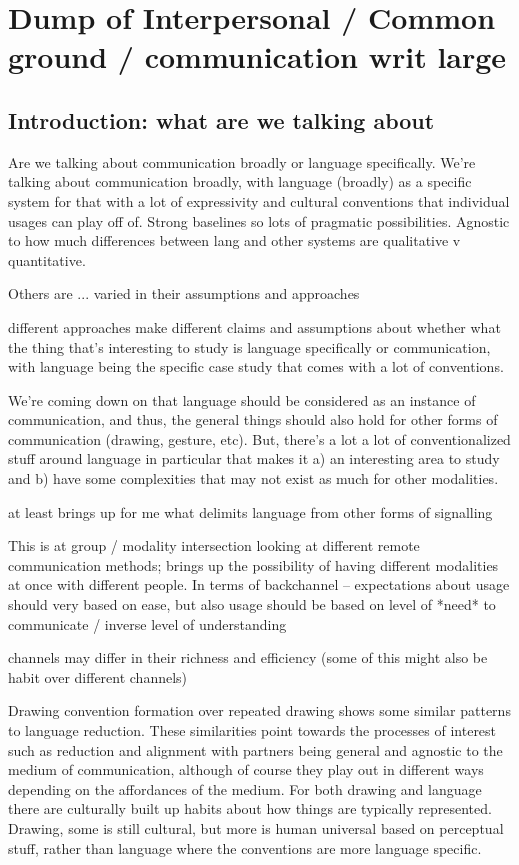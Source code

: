 \documentclass[]{article}
\begin{document}
\section{Dump of Interpersonal / Common ground / communication writ large}

\subsection{Introduction: what are we talking about}
Are we talking about communication broadly or language specifically. 
We're talking about communication broadly, with language (broadly) as a specific system for that with a lot of expressivity and cultural conventions that individual usages can play off of. Strong baselines so lots of pragmatic possibilities. 
Agnostic to how much differences between lang and other systems are qualitative v quantitative. 

Others are ... varied in their assumptions and approaches 

different approaches make different claims and assumptions about whether what the thing that's interesting to study is language specifically or communication, with language being the specific case study that comes with a lot of conventions. 

We're coming down on that language should be considered as an instance of communication, and thus, the general things should also hold for other forms of communication (drawing, gesture, etc). But, there's a lot a lot of conventionalized stuff around language in particular that makes it a) an interesting area to study and b) have some complexities that may not exist as much for other modalities. 

\cite{clark1996} at least brings up for me what delimits language from other forms of signalling

This is at group / modality intersection \cite{foxtree2013} looking at different remote communication methods; brings up the possibility of having different modalities at once with different people. In terms of backchannel -- expectations about usage should very based on ease, but also usage should be based on level of *need* to communicate / inverse level of understanding 

channels may differ in their richness and efficiency (some of this might also be habit over different channels)

\cite{hawkinsa} Drawing convention formation over repeated drawing shows some similar patterns to language reduction. These similarities point towards the processes of interest such as reduction and alignment with partners being general and agnostic to the medium of communication, although of course they play out in different ways depending on the affordances of the medium. For both drawing and language there are culturally built up habits about how things are typically represented. Drawing, some is still cultural, but more is human universal based on perceptual stuff, rather than language where the conventions are more language specific. 
\end{document}

